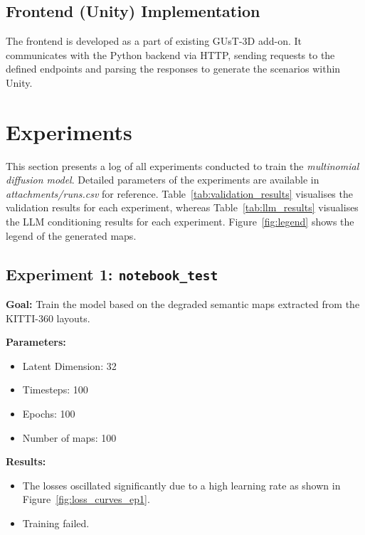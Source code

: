 \documentclass{article}
\begin{document}
\subsection{Frontend (Unity) Implementation}

The frontend is developed as a part of existing GUsT-3D add-on. It communicates with the Python backend via HTTP, sending requests to the defined endpoints and parsing the responses to generate the scenarios within Unity.


\section{Experiments}
\label{sec:experiments}

This section presents a log of all experiments conducted to train the \textit{multinomial diffusion model}. Detailed parameters of the experiments are available in \emph{attachments/runs.csv} for reference. Table~\ref{tab:validation_results} visualises the validation results for each experiment, whereas Table~\ref{tab:llm_results} visualises the LLM conditioning results for each experiment. Figure~\ref{fig:legend} shows the legend of the generated maps.

\subsection{Experiment 1: \texttt{notebook\_test}}

\textbf{Goal:} Train the model based on the degraded semantic maps extracted from the KITTI-360 layouts.

\textbf{Parameters:}
\begin{itemize}
    \item Latent Dimension: 32
    \item Timesteps: 100
    \item Epochs: 100
    \item Number of maps: 100
\end{itemize}


\textbf{Results:}
\begin{itemize}
    \item The losses oscillated significantly due to a high learning rate as shown in Figure~\ref{fig:loss_curves_ep1}.
    \item Training failed.
\end{itemize}
\end{document}
